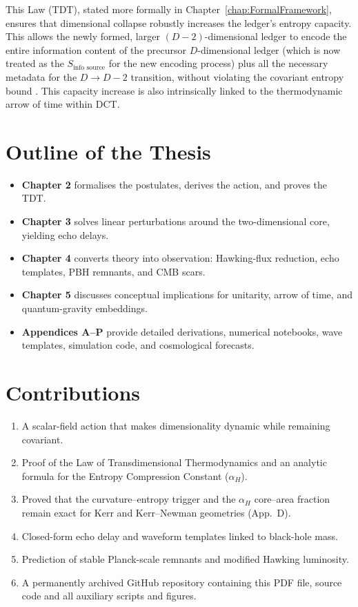\documentclass[a4paper, 12pt, oneside]{book}
\numberwithin{equation}{chapter}
\begin{document}
This Law (TDT), stated more formally in Chapter~\ref{chap:FormalFramework}, ensures that dimensional collapse robustly increases the ledger's entropy capacity. This allows the newly formed, larger $(D-2)$-dimensional ledger to encode the entire information content of the precursor $D$-dimensional ledger (which is now treated as the $S_{\text{info source}}$ for the new encoding process) plus all the necessary metadata for the $D \to D-2$ transition, without violating the covariant entropy bound \cite{Bousso1999}. This capacity increase is also intrinsically linked to the thermodynamic arrow of time within DCT.

\section{Outline of the Thesis}

\begin{itemize}
  \item \textbf{Chapter 2} formalises the postulates, derives the action,
        and proves the TDT.
  \item \textbf{Chapter 3} solves linear perturbations around the
        two-dimensional core, yielding echo delays.
  \item \textbf{Chapter 4} converts theory into observation:
        Hawking-flux reduction, echo templates, PBH remnants, and CMB scars.
  \item \textbf{Chapter 5} discusses conceptual implications for unitarity,
        arrow of time, and quantum-gravity embeddings.
  \item \textbf{Appendices A–P} provide detailed derivations, numerical
        notebooks, wave templates, simulation code, and cosmological
        forecasts.
\end{itemize}

\section{Contributions}

\begin{enumerate}[label=\textbf{C\arabic*}]
  \item A scalar-field action that makes dimensionality dynamic while
        remaining covariant.
  \item Proof of the Law of Transdimensional Thermodynamics and an analytic formula for the Entropy Compression Constant ($\alpha_H$).
  \item Proved that the curvature–entropy trigger and the
      $\alpha_H$ core–area fraction remain exact for Kerr
      and Kerr–Newman geometries (App.~D).
  \item Closed-form echo delay and waveform templates linked to black-hole
        mass.
  \item Prediction of stable Planck-scale remnants and modified Hawking
        luminosity.
  \item A permanently archived GitHub repository containing this PDF file, source code and all auxiliary scripts and figures.
\end{enumerate}
\end{document}
